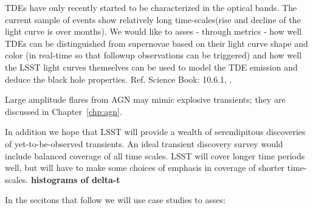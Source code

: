 TDEs have only recently started to be characterized in the optical bands. The current sample of events show relatively long time-scales(rise and decline of the light curve is over months). We would like to asses - through metrics - how well TDEs can be distinguished from supernovae based on their light curve shape and color (in real-time so that followup observations can be triggered) and how well the LSST light curves themselves can be used to model the TDE emission and deduce the black hole properties.
Ref. Science Book: 10.6.1, \citet{Gezari2012, Chornock2014, Arcavi2014, Holoien2014, Holoien2015, Holoien2016}.

Large amplitude flares from AGN may mimic
explosive transients; they are discussed in Chapter~\ref{chp:agn}.

In addition we hope that LSST will provide a wealth of serendipitous
discoveries of yet-to-be-observed transients.  An ideal transient
discovery survey would include balanced coverage of all time scales. LSST
will cover longer time periods well, but will have to make some
choices of emphasis in coverage of shorter time-scales. 
\textbf{histograms of delta-t}

In the secitons that follow we will use case studies to asses:

